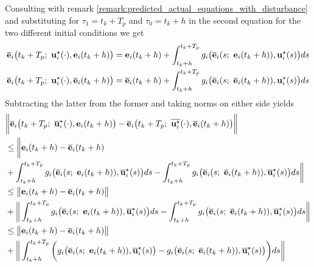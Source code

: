\begin{gg_box}
Consulting with remark \eqref{remark:predicted_actual_equations_with_disturbance}
and substituting for $\tau_1 = t_k + T_p$ and $\tau_0 = t_k +h$ in the second
equation for the two different initial conditions we get
\begin{align}
  \overline{\bm{\mathbf{e}}}_i\big(t_k + T_p;\ \bm{\mathbf{u}}_i^{\star}(\cdot), \bm{\mathbf{e}}_i(t_k +h)\big) &=
    \bm{\mathbf{e}}_i(t_k +h) + \int_{t_k +h}^{t_k + T_p} g_i\big(\overline{\bm{\mathbf{e}}}_i(s;\ \bm{\mathbf{e}}_i(t_k + h)), \bm{\mathbf{u}}_i^{\star}(s)\big) ds \\
  \overline{\bm{\mathbf{e}}}_i\big(t_k + T_p;\ \bm{\mathbf{u}}_i^{\star}(\cdot), \overline{\bm{\mathbf{e}}}_i(t_k +h)\big) &=
    \overline{\bm{\mathbf{e}}}_i(t_k +h) + \int_{t_k +h}^{t_k + T_p} g_i\big(\overline{\bm{\mathbf{e}}}_i(s;\ \overline{\bm{\mathbf{e}}}_i(t_k + h)), \bm{\mathbf{u}}_i^{\star}(s)\big) ds
\end{align}
Subtracting the latter from the former and taking norms on either side yields
\begin{align}
  &\bigg\| \overline{\vect{e}}_i\big(t_k + T_p;\ \overline{\vect{u}}_i^{\star}(\cdot), \vect{e}_i(t_k +h)\big) -
    \overline{\vect{e}}_i\big(t_k + T_p;\ \overline{\vect{u}_i^{\star}}(\cdot), \overline{\vect{e}}_i(t_k +h)\big) \bigg\| \\
  &\leq \bigg \| \vect{e}_i(t_k +h) - \overline{\vect{e}}_i(t_k +h) \\
  &+ \int_{t_k +h}^{t_k + T_p} g_i\big(\overline{\vect{e}}_i(s;\ \vect{e}_i(t_k + h)), \overline{\vect{u}}_i^{\star}(s)\big) ds
    - \int_{t_k +h}^{t_k + T_p} g_i\big(\overline{\vect{e}}_i(s;\ \overline{\vect{e}}_i(t_k + h)), \overline{\vect{u}}_i^{\star}(s)\big) ds\bigg\| \\
  &\leq \big \| \vect{e}_i(t_k +h) - \overline{\vect{e}}_i(t_k +h) \big \| \\
  &+ \bigg\| \int_{t_k +h}^{t_k + T_p} g_i\big(\overline{\vect{e}}_i(s;\ \vect{e}_i(t_k + h)), \overline{\vect{u}}_i^{\star}(s)\big) ds
    - \int_{t_k +h}^{t_k + T_p} g_i\big(\overline{\vect{e}}_i(s;\ \overline{\vect{e}}_i(t_k + h)), \overline{\vect{u}}_i^{\star}(s)\big) ds\bigg\| \\
  &\leq \big \| \vect{e}_i(t_k +h) - \overline{\vect{e}}_i(t_k +h) \big \| \\
  &+ \bigg\| \int_{t_k +h}^{t_k + T_p} \bigg( g_i\big(\overline{\vect{e}}_i(s;\ \vect{e}_i(t_k + h)), \overline{\vect{u}}_i^{\star}(s)\big)
    - g_i\big(\overline{\vect{e}}_i(s;\ \overline{\vect{e}}_i(t_k + h)), \overline{\vect{u}}_i^{\star}(s)\big) \bigg)ds\bigg\| \\

\end{align}
\end{gg_box}
